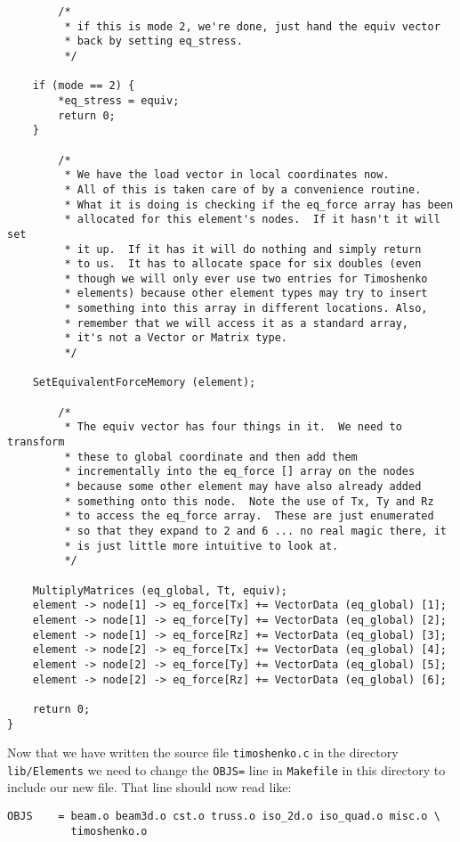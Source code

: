 {\begin{screen}
\begin{verbatim}
        /*
         * if this is mode 2, we're done, just hand the equiv vector 
         * back by setting eq_stress.
         */

    if (mode == 2) {
        *eq_stress = equiv;
        return 0;
    }

        /* 
         * We have the load vector in local coordinates now.  
         * All of this is taken care of by a convenience routine.
         * What it is doing is checking if the eq_force array has been 
         * allocated for this element's nodes.  If it hasn't it will set
         * it up.  If it has it will do nothing and simply return
         * to us.  It has to allocate space for six doubles (even
         * though we will only ever use two entries for Timoshenko
         * elements) because other element types may try to insert
         * something into this array in different locations. Also,
         * remember that we will access it as a standard array, 
         * it's not a Vector or Matrix type.
         */

    SetEquivalentForceMemory (element);

        /*
         * The equiv vector has four things in it.  We need to transform
         * these to global coordinate and then add them 
         * incrementally into the eq_force [] array on the nodes
         * because some other element may have also already added 
         * something onto this node.  Note the use of Tx, Ty and Rz
         * to access the eq_force array.  These are just enumerated
         * so that they expand to 2 and 6 ... no real magic there, it
         * is just little more intuitive to look at.
         */

    MultiplyMatrices (eq_global, Tt, equiv);
    element -> node[1] -> eq_force[Tx] += VectorData (eq_global) [1];
    element -> node[1] -> eq_force[Ty] += VectorData (eq_global) [2];
    element -> node[1] -> eq_force[Rz] += VectorData (eq_global) [3];
    element -> node[2] -> eq_force[Tx] += VectorData (eq_global) [4];
    element -> node[2] -> eq_force[Ty] += VectorData (eq_global) [5];
    element -> node[2] -> eq_force[Rz] += VectorData (eq_global) [6];

    return 0;
}
 \end{verbatim}
\end{screen}}

Now that we have written the source file {\tt timoshenko.c} in the directory
{\tt lib/Elements} we need to change the {\tt OBJS=} line in {\tt Makefile} 
in this directory to include our new file.  That line should now read like:
\begin{screen}
 \begin{verbatim}
OBJS    = beam.o beam3d.o cst.o truss.o iso_2d.o iso_quad.o misc.o \
          timoshenko.o
 \end{verbatim}
\end{screen}

